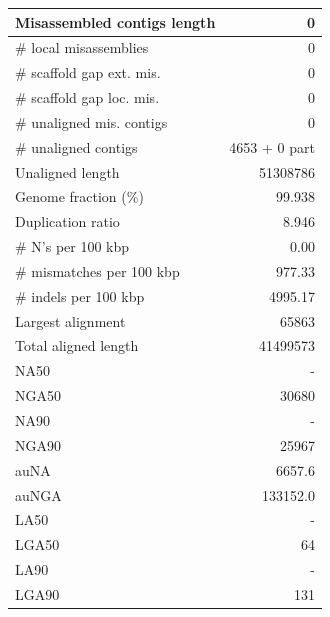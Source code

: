 \documentclass[12pt,a4paper]{article}
\begin{document}
\begin{table}[ht]
\begin{center}
\begin{tabular}{|l*{1}{|r}|}
Misassembled contigs length & 0 \\ \hline
\# local misassemblies & 0 \\ \hline
\# scaffold gap ext. mis. & 0 \\ \hline
\# scaffold gap loc. mis. & 0 \\ \hline
\# unaligned mis. contigs & 0 \\ \hline
\# unaligned contigs & 4653 + 0 part \\ \hline
Unaligned length & 51308786 \\ \hline
Genome fraction (\%) & 99.938 \\ \hline
Duplication ratio & 8.946 \\ \hline
\# N's per 100 kbp & 0.00 \\ \hline
\# mismatches per 100 kbp & 977.33 \\ \hline
\# indels per 100 kbp & 4995.17 \\ \hline
Largest alignment & 65863 \\ \hline
Total aligned length & 41499573 \\ \hline
NA50 & - \\ \hline
NGA50 & 30680 \\ \hline
NA90 & - \\ \hline
NGA90 & 25967 \\ \hline
auNA & 6657.6 \\ \hline
auNGA & 133152.0 \\ \hline
LA50 & - \\ \hline
LGA50 & 64 \\ \hline
LA90 & - \\ \hline
LGA90 & 131 \\ \hline
\end{tabular}
\end{center}
\end{table}
\end{document}

